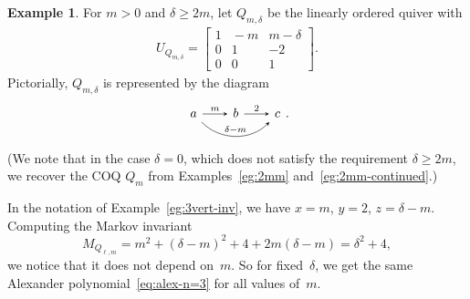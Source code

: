 \documentclass[11pt, letterpaper]{amsart}
\theoremstyle{definition}
\newtheorem{example}[theorem]{Example}
\numberwithin{equation}{section}
\begin{document}
\begin{example}
\label{eg:2m-delta}
For $m>0$ and $\delta\ge 2m$, let $Q_{m,\delta}$ be the linearly ordered quiver with
\begin{align*}
U_{Q_{m,\delta}}=\begin{bmatrix} 
1 &  \! \!-m \! \! & m-\delta \\
0 &  \! \!1 \! \! & -2 \\
0 &  \! \!0 \! \! & 1
\end{bmatrix}. 
\end{align*}
Pictorially, $Q_{m,\delta}$ is represented by the diagram
\begin{equation}
\label{eq:Qlm}
 \begin{tikzcd}[arrows={-stealth}, sep=2em]
  a  \arrow[r,  "m"]  \arrow[rr, bend right=45, "\delta-m"]  & b  \arrow[r, "2"] & c 
\end{tikzcd}. 
\end{equation}
(We note that in the case $\delta=0$, which does not satisfy the requirement $\delta\ge 2m$,
we recover the COQ $Q_m$ from Examples~\ref{eg:2mm} and~\ref{eg:2mm-continued}.) 

In the notation of Example~\ref{eg:3vert-inv}, we have $x=m$, $y=2$, $z=\delta-m$. 
Computing the Markov invariant %
\begin{equation*}
M_{Q_{\ell,m}}=m^2+(\delta-m)^2+4+2m(\delta-m) = \delta^2+4 , 
\end{equation*}
we notice that it does not depend on~$m$.
So for fixed~$\delta$, we get the same Alexander polynomial~\eqref{eq:alex-n=3} for all values of~$m$. 


\end{example}
\end{document}
